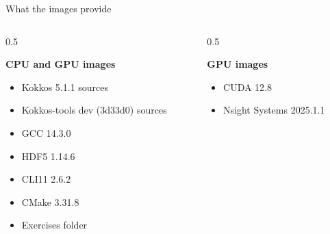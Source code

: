 \documentclass[
    aspectratio=169,
]{beamer}
\begin{document}
\begin{frame}{What the images provide}
    \begin{columns}[t]
        \begin{column}{0.5\linewidth}
            \begin{center}
                \textbf{CPU and GPU images}
            \end{center}
            \begin{itemize}
                \item Kokkos 5.1.1 sources
                \item Kokkos-tools dev (3d33d0) sources
                \item GCC 14.3.0
                \item HDF5 1.14.6
                \item CLI11 2.6.2
                \item CMake 3.31.8
                \item Exercises folder
            \end{itemize}
        \end{column}
        \pause
        \begin{column}{0.5\linewidth}
            \begin{center}
                \textbf{GPU images}
            \end{center}
            \begin{itemize}
                \item CUDA 12.8
                \item Nsight Systems 2025.1.1
            \end{itemize}
        \end{column}
    \end{columns}

\end{frame}
\end{document}
